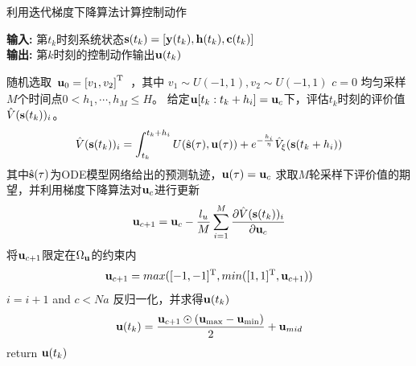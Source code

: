 \begin{algorithm}[!ht]
\caption{利用迭代梯度下降算法计算控制动作} %
\label{alg:find_optimal_policy}
\hspace*{0.02in} {\bf 输入:} %
第$t_k$时刻系统状态$\mathbf s(t_k)=[\mathbf y(t_k),\mathbf h(t_k),\mathbf c(t_k)]$\\
\hspace*{0.02in} {\bf 输出:} %
第$k$时刻的控制动作输出${\mathbf u}(t_k)$
\begin{algorithmic}[1]
\State 随机选取$
\begin{array}{c}{\mathbf u_{0}=\left[v_{1}, v_{2}\right]^{\rm T}} \end{array}
$，其中 $v_{1} \sim U(-1,1) , v_{2} \sim U(-1,1)$ 
\State $c=0$
  \Do
    \State 均匀采样$M$个时间点$0 < h_1, \cdots, h_M \leq H$。
    \State 给定$\mathbf u[t_k:t_k+h_i]=\mathbf u _c$下，评估$t_k$时刻的评价值$\hat{V}(\mathbf s(t_k))_i$。
    \begin{equation}
    \hat{V}(\mathbf s(t_k))_i = \int_{t_k}^{t_k+h_i}U(\hat{\mathbf s}(\tau),{\mathbf u}(\tau))+e^{-\frac{h_i}{\eta}}\hat{V}_\xi(\mathbf s(t_k+h_i))
    \label{equ:estimate_J_next}
    \end{equation}
    其中$\hat{\mathbf s}(\tau)$为ODE模型网络给出的预测轨迹，$\mathbf u(\tau)=\mathbf u _c$
\EndFor
\State 求取$M$轮采样下评价值的期望，并利用梯度下降算法对$\mathbf u_c$进行更新
\begin{equation}
\mathbf u_{c+1}=\mathbf u_c- \frac{l_u}{M}\sum_{i=1}^{M}\frac{\partial \hat{V}(\mathbf s(t_k))_i}{\partial \mathbf u_{c}}
\end{equation}
\State 将$\mathbf u_{c+1}$限定在$\Omega_{\mathbf u}$的约束内
\begin{equation}
\mathbf u_{c+1} = max([-1,-1]^{\rm T}, min([1,1]^{\rm T},\mathbf u_{c+1}))
\end{equation}
\State $i=i+1$
   and $c<Na$ %
  \State 反归一化，并求得${\mathbf u}(t_k)$
 \begin{equation}
\mathbf u(t_k)=\frac{\mathbf u_{c+1} \odot\left(\mathbf u_{\max }-\mathbf u_{\min
}\right)}{2}+\mathbf u_{mid }
\end{equation}
\State return $\mathbf u(t_k)$
\end{algorithmic}

\end{algorithm}

